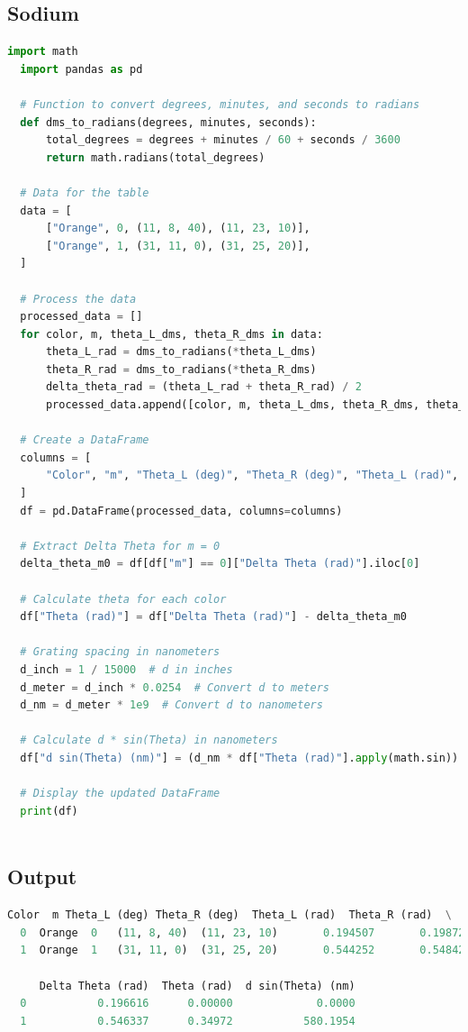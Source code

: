\documentclass[a4paper,11pt]{article}
\begin{document}
\newpage
%
\subsection*{Sodium}
\begin{lstlisting}[language=Python]
  import math
  import pandas as pd
  
  # Function to convert degrees, minutes, and seconds to radians
  def dms_to_radians(degrees, minutes, seconds):
      total_degrees = degrees + minutes / 60 + seconds / 3600
      return math.radians(total_degrees)
  
  # Data for the table
  data = [
      ["Orange", 0, (11, 8, 40), (11, 23, 10)],
      ["Orange", 1, (31, 11, 0), (31, 25, 20)],
  ]
  
  # Process the data
  processed_data = []
  for color, m, theta_L_dms, theta_R_dms in data:
      theta_L_rad = dms_to_radians(*theta_L_dms)
      theta_R_rad = dms_to_radians(*theta_R_dms)
      delta_theta_rad = (theta_L_rad + theta_R_rad) / 2
      processed_data.append([color, m, theta_L_dms, theta_R_dms, theta_L_rad, theta_R_rad, delta_theta_rad])
  
  # Create a DataFrame
  columns = [
      "Color", "m", "Theta_L (deg)", "Theta_R (deg)", "Theta_L (rad)", "Theta_R (rad)", "Delta Theta (rad)"
  ]
  df = pd.DataFrame(processed_data, columns=columns)
  
  # Extract Delta Theta for m = 0
  delta_theta_m0 = df[df["m"] == 0]["Delta Theta (rad)"].iloc[0]
  
  # Calculate theta for each color
  df["Theta (rad)"] = df["Delta Theta (rad)"] - delta_theta_m0
  
  # Grating spacing in nanometers
  d_inch = 1 / 15000  # d in inches
  d_meter = d_inch * 0.0254  # Convert d to meters
  d_nm = d_meter * 1e9  # Convert d to nanometers
  
  # Calculate d * sin(Theta) in nanometers
  df["d sin(Theta) (nm)"] = (d_nm * df["Theta (rad)"].apply(math.sin)).round(4)
  
  # Display the updated DataFrame
  print(df)
  
\end{lstlisting}
\subsection*{Output}
\begin{lstlisting}[language=Python]
  Color  m Theta_L (deg) Theta_R (deg)  Theta_L (rad)  Theta_R (rad)  \
  0  Orange  0   (11, 8, 40)  (11, 23, 10)       0.194507       0.198725   
  1  Orange  1   (31, 11, 0)  (31, 25, 20)       0.544252       0.548421   
  
     Delta Theta (rad)  Theta (rad)  d sin(Theta) (nm)  
  0           0.196616      0.00000             0.0000  
  1           0.546337      0.34972           580.1954
\end{lstlisting}
\end{document}
